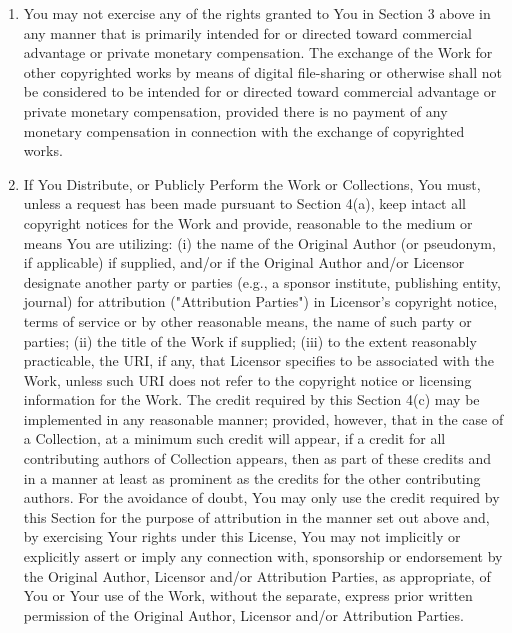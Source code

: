 \begin{enumerate}
\begin{enumerate}
            \item You may not exercise any of the rights granted to You in
                Section 3 above in any manner that is primarily intended for or
                directed toward commercial advantage or private monetary
                compensation. The exchange of the Work for other copyrighted
                works by means of digital file-sharing or otherwise shall not
                be considered to be intended for or directed toward commercial
                advantage or private monetary compensation, provided there is
                no payment of any monetary compensation in connection with the
                exchange of copyrighted works.
            
            \item If You Distribute, or Publicly Perform the Work or
                Collections, You must, unless a request has been made pursuant
                to Section 4(a), keep intact all copyright notices for the Work
                and provide, reasonable to the medium or means You are
                utilizing: (i) the name of the Original Author (or pseudonym,
                if applicable) if supplied, and/or if the Original Author
                and/or Licensor designate another party or parties (e.g., a
                sponsor institute, publishing entity, journal) for attribution
                ("Attribution Parties") in Licensor's copyright notice, terms
                of service or by other reasonable means, the name of such party
                or parties; (ii) the title of the Work if supplied; (iii) to
                the extent reasonably practicable, the URI, if any, that
                Licensor specifies to be associated with the Work, unless such
                URI does not refer to the copyright notice or licensing
                information for the Work. The credit required by this Section
                4(c) may be implemented in any reasonable manner; provided,
                however, that in the case of a Collection, at a minimum such
                credit will appear, if a credit for all contributing authors of
                Collection appears, then as part of these credits and in a
                manner at least as prominent as the credits for the other
                contributing authors. For the avoidance of doubt, You may only
                use the credit required by this Section for the purpose of
                attribution in the manner set out above and, by exercising Your
                rights under this License, You may not implicitly or explicitly
                assert or imply any connection with, sponsorship or endorsement
                by the Original Author, Licensor and/or Attribution Parties, as
                appropriate, of You or Your use of the Work, without the
                separate, express prior written permission of the Original
                Author, Licensor and/or Attribution Parties.


\end{enumerate}
\end{enumerate}
